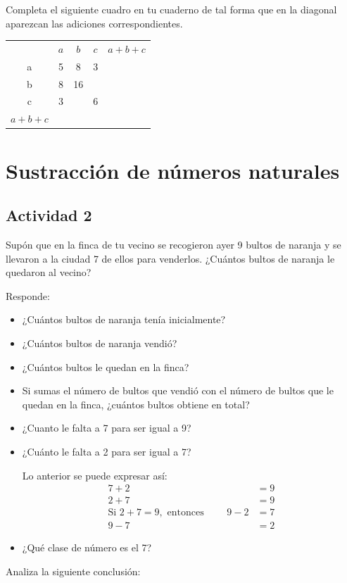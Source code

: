 \documentclass[10pt,twoside]{article}
\begin{document}
\begin{enumerate}
\begin{minipage}{.45\textwidth}
\item Completa el siguiente cuadro en tu cuaderno de tal forma que en la diagonal
aparezcan las adiciones correspondientes.
\end{minipage}\hfill
\begin{minipage}{.45\textwidth}
\begin{tabular}{ccccc}
 & $a$ & $b$ & $c$ & $a+b+c$ \\ 
\cline{2-5} 
a & \vline \hfill 5 \hfill \vline & 8 \hfill \vline & 3 \hfill \vline & \hfill \vline   \\ \cline{2-5}
b & \vline \hfill 8 \hfill \vline & 16 \hfill \vline & \hfill \vline & \\ \cline{2-4}
c & \vline \hfill 3 \hfill \vline & \hfill \vline & 6 \hfill \vline & \\ \cline{2-4}
$a+b+c$ &  \vline \hfill \hspace*{10pt} \hfill \vline & & \\ \cline{2-2}
\end{tabular} 
\end{minipage}
\end{enumerate}
\section*{Sustracci\'on de n\'umeros naturales}
\subsection*{Actividad 2}
Supón que en la finca de tu vecino se recogieron ayer 9 bultos de naranja y se
llevaron a la ciudad 7 de ellos para venderlos. ¿Cuántos bultos de naranja le
quedaron al vecino?

Responde:
\begin{itemize}
\item ¿Cuántos bultos de naranja tenía inicialmente?
\item ¿Cuántos bultos de naranja vendió?
\item ¿Cuántos bultos le quedan en la finca?
\item Si sumas el número de bultos que vendió con el número de bultos que le
    quedan en la finca, ¿cuántos bultos obtiene en total?
\item ¿Cuanto le falta a 7 para ser igual a 9?
\item ¿Cuánto le falta a 2 para ser igual a 7?

Lo anterior se puede expresar así: 
\begin{align*}
7 + 2 &= 9\\
2+7&=9\\
\mbox{Si } 2+7=9, \mbox{ entonces }\qquad 9-2&=7\\
9-7&=2 
\end{align*}
\item ¿Qué clase de número es el 7?
\end{itemize}
Analiza la siguiente conclusión:
\end{document}
